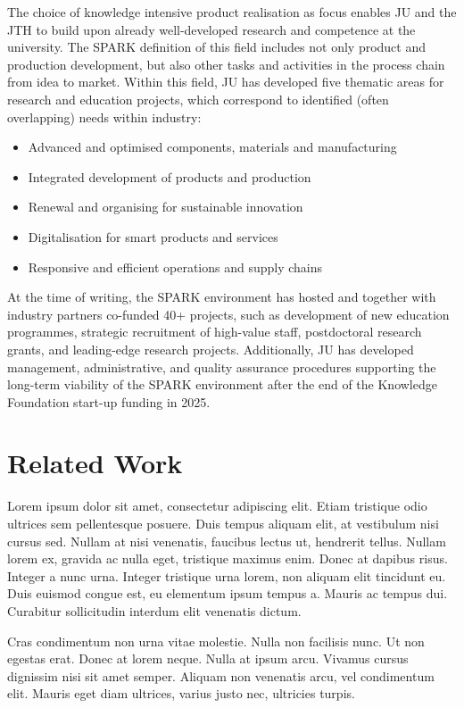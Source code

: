 \documentclass[11pt, a4paper]{JTH}
\begin{document}
The choice of knowledge intensive product realisation as focus enables JU and the JTH to build upon already well-developed research and competence at the university. The SPARK definition of this field includes not only product and production development, but also other tasks and activities in the process chain from idea to market. Within this field, JU has developed five thematic areas for research and education projects, which correspond to identified (often overlapping) needs within industry:

\begin{itemize}
    \item Advanced and optimised components, materials and manufacturing
    \item Integrated development of products and production
    \item Renewal and organising for sustainable innovation
    \item Digitalisation for smart products and services
    \item Responsive and efficient operations and supply chains
\end{itemize}

At the time of writing, the SPARK environment has hosted and together with industry partners co-funded 40+ projects, such as development of new education programmes, strategic recruitment of high-value staff, postdoctoral research grants, and leading-edge research projects. Additionally, JU has developed management, administrative, and quality assurance procedures supporting the long-term viability of the SPARK environment after the end of the Knowledge Foundation start-up funding in 2025.

\chapter{Related Work}
\label{chap:RelatedWork}

Lorem ipsum dolor sit amet, consectetur adipiscing elit. Etiam tristique odio ultrices sem pellentesque posuere. Duis tempus aliquam elit, at vestibulum nisi cursus sed. Nullam at nisi venenatis, faucibus lectus ut, hendrerit tellus. Nullam lorem ex, gravida ac nulla eget, tristique maximus enim. Donec at dapibus risus. Integer a nunc urna. Integer tristique urna lorem, non aliquam elit tincidunt eu. Duis euismod congue est, eu elementum ipsum tempus a. Mauris ac tempus dui. Curabitur sollicitudin interdum elit venenatis dictum.

Cras condimentum non urna vitae molestie. Nulla non facilisis nunc. Ut non egestas erat. Donec at lorem neque. Nulla at ipsum arcu. Vivamus cursus dignissim nisi sit amet semper. Aliquam non venenatis arcu, vel condimentum elit. Mauris eget diam ultrices, varius justo nec, ultricies turpis.
\end{document}
